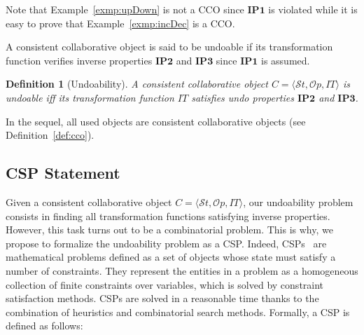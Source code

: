 \documentclass[submission,copyright,creativecommons]{eptcs}
\newtheorem{definition}{Definition}
\begin{document}
Note that Example~\ref{exmp:upDown} is not a CCO since $\mathbf{IP1}$ is violated while it is easy to prove that Example~\ref{exmp:incDec} is a CCO. 
 
A consistent collaborative object is said to be undoable if its transformation function verifies inverse properties $\mathbf{IP2}$ and $\mathbf{IP3}$ since $\mathbf{IP1}$ is assumed.

 \begin{definition}[Undoability]\label{def:undo}
A consistent collaborative object $C=\langle\mathcal{S}t,\mathcal{O}p,IT\rangle$ is \emph{undoable} iff its transformation
function $IT$ satisfies undo properties $\mathbf{IP2}$ and $\mathbf{IP3}$.
\end{definition}
 
In the sequel, all used objects are consistent collaborative objects (see Definition~\ref{def:cco}). 
 
  
\subsection{CSP Statement}
Given a consistent collaborative object $C=\langle\mathcal{S}t,\mathcal{O}p,IT\rangle$,
our undoability problem consists in finding all transformation functions satisfying inverse
properties. However, this task  turns out to be a combinatorial problem. This is why, we propose to formalize the undoability problem as a CSP. Indeed, CSPs~\cite{CSP} are mathematical problems defined as a set of objects whose state must satisfy a number of constraints. 
They represent the entities in a problem as a homogeneous collection of finite constraints over variables, which is solved by constraint satisfaction methods.   CSPs  are solved in a reasonable time thanks to the combination of heuristics and combinatorial search methods.
Formally, a CSP is defined as follows:  
\end{document}
